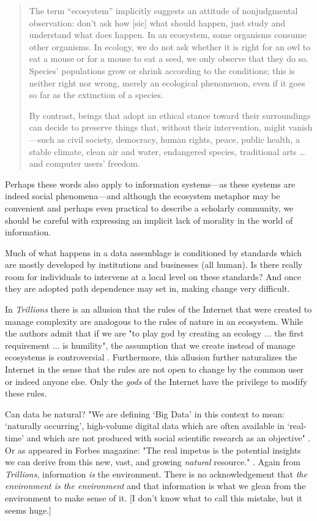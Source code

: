 \begin{quote}
The term “ecosystem” implicitly suggests an attitude of nonjudgmental observation: don't ask how [sic] what should happen, just study and understand what does happen. In an ecosystem, some organisms consume other organisms. In ecology, we do not ask whether it is right for an owl to eat a mouse or for a mouse to eat a seed, we only observe that they do so. Species' populations grow or shrink according to the conditions; this is neither right nor wrong, merely an ecological phenomenon, even if it goes so far as the extinction of a species.

By contrast, beings that adopt an ethical stance toward their surroundings can decide to preserve things that, without their intervention, might vanish—such as civil society, democracy, human rights, peace, public health, a stable climate, clean air and water, endangered species, traditional arts … and computer users' freedom. \citep{fsf_2014}
\end{quote}

Perhaps these words also apply to information systems—as these systems are indeed social phenomena—and although the ecosystem metaphor may be convenient and perhaps even practical to describe a scholarly community, we should be careful with expressing an implicit lack of morality in the world of information. 


Much of what happens in a data assemblage is conditioned by standards which are mostly developed by institutions and businesses (all human). Is there really room for individuals to intervene at a local level on these standards? And once they are adopted path dependence may set in, making change very difficult. 

In \textit{Trillions} there is an allusion that the rules of the Internet that were created to manage complexity are analogous to the rules of nature in an ecosystem. While the authors admit that if we are "to play god by creating an ecology ... the first requirement ... is humility", the assumption that we create instead of manage ecosystems is controversial \citep[][p. 140]{lucas_2012}. Furthermore, this allusion further naturalizes the Internet in the sense that the rules are not open to change by the common user or indeed anyone else. Only the \textit{gods} of the Internet have the privilege to modify these rules.

Can data be natural? "We are defining ‘Big Data’ in this context to mean: ‘naturally occurring’, high-volume digital data which are often available in ‘real-time’ and which are not produced with social scientific research as an objective" \citep{ncrm_2015}. Or as appeared in Forbes magazine: "The real impetus is the potential insights we can derive from this new, vast, and growing \textit{natural} resource." \citep[][emphasis ours]{rotella_2012}. Again from \textit{Trillions}, information \textit{is} the environment. There is no acknowledgement that \textit{the environment is the environment} and that information is what we glean from the environment to make sense of it. [I don't know what to call this mistake, but it seems huge.]


